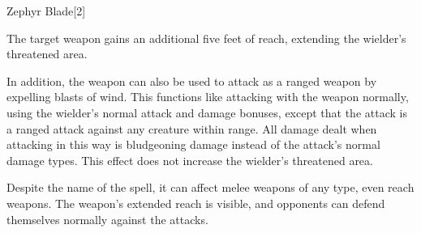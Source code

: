 \begin{spellsection}{Zephyr Blade}[2]
    \begin{spellheader}
    \end{spellheader}
    \begin{spellcontent}
        \begin{spelltargetinginfo}
        \end{spelltargetinginfo}
        \begin{spelleffects}
            \spelleffect The target weapon gains an additional five feet of reach, extending the wielder's threatened area.

            In addition, the weapon can also be used to attack as a ranged weapon by expelling blasts of wind. This functions like attacking with the weapon normally, using the wielder's normal attack and damage bonuses, except that the attack is a ranged attack against any creature within \rngclose range. All damage dealt when attacking in this way is bludgeoning damage instead of the attack's normal damage types. This effect does not increase the wielder's threatened area.
            \spelldur \durpersonallong
        \end{spelleffects}
    \end{spellcontent}
    \begin{spellfooter}
        \spellnotes Despite the name of the spell, it can affect melee weapons of any type, even reach weapons. The weapon's extended reach is visible, and opponents can defend themselves normally against the attacks.
        \miscastexplode
    \end{spellfooter}
\end{spellsection}
